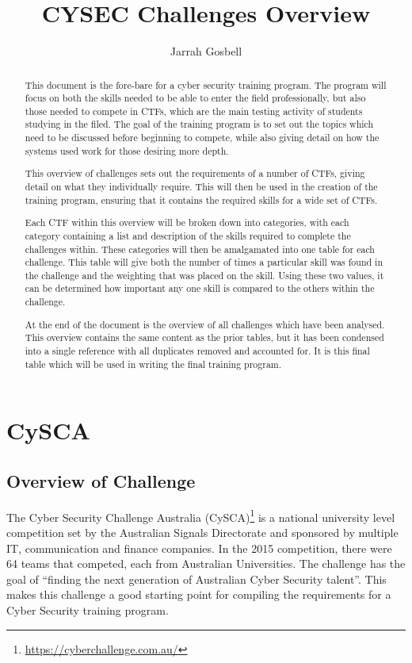 \documentclass[a4paper,11pt]{report}
\author{Jarrah Gosbell}
\title{CYSEC Challenges Overview}
\begin{document}
\maketitle
\tableofcontents
\begin{abstract}
	This document is the fore-bare for a cyber security training program. 
	The program will focus on both the skills needed to be able to enter the field professionally, but also those needed to compete in CTFs, which are the main testing activity of students studying in the filed. 
	The goal of the training program is to set out the topics which need to be discussed before beginning to compete, 
	while also giving detail on how the systems used work for those desiring more depth. 

	This overview of challenges sets out the requirements of a number of CTFs, giving detail on what they individually require. 
	This will then be used in the creation of the training program, ensuring that it contains the required skills for a wide set of CTFs. 

	Each CTF within this overview will be broken down into categories, with each category containing a list and description of the skills required to complete the challenges within. 
	These categories will then be amalgamated into one table for each challenge. 
	This table will give both the number of times a particular skill was found in the challenge and the weighting that was placed on the skill. 
	Using these two values, it can be determined how important any one skill is compared to the others within the challenge. 

	At the end of the document is the overview of all challenges which have been analysed. 
	This overview contains the same content as the prior tables, but it has been condensed into a single reference with all duplicates removed and accounted for. 
	It is this final table which will be used in writing the final training program. 
\end{abstract}
\chapter{CySCA}
	\section{Overview of Challenge}
		The Cyber Security Challenge Australia (CySCA)\footnote{\url{https://cyberchallenge.com.au/}} is a national university level competition set by the Australian Signals Directorate 
		and sponsored by multiple IT, communication and finance companies. 
		In the 2015 competition, there were 64 teams that competed, each from Australian Universities. 
		The challenge has the goal of ``finding the next generation of Australian Cyber Security talent''.
		This makes this challenge a good starting point for compiling the requirements for a Cyber Security training program. 
\end{document}
